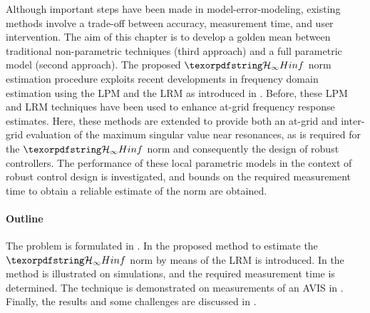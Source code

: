 Although important steps have been made in model-error-modeling, existing methods involve a trade-off between accuracy, measurement time, and user intervention.
The aim of this chapter is to develop a golden mean between traditional non-parametric techniques (third approach) and a full parametric model (second approach).
The proposed $\Hinf{}$ norm estimation procedure exploits recent developments in frequency domain estimation using the \gls{LPM} \citep{Schoukens2009LPM} and the \gls{LRM} \citep{McKelvey2012LRM} as introduced in \citet{Geerardyn2014IFAC,Geerardyn2014ISMA}.
Before, these \gls{LPM} and \gls{LRM} techniques have been used to enhance at-grid frequency response estimates.
Here, these methods are extended to provide both an at-grid and inter-grid evaluation of the maximum singular value near resonances, as is required for the $\Hinf{}$ norm and consequently the design of robust controllers.
The performance of these local parametric models in the context of robust control design is investigated, and bounds on the required measurement time to obtain a reliable estimate of the \Hinf{} norm are obtained.

\paragraph*{Outline}
\label{par:lrmhinf:toc}
The problem is formulated in .
In  the proposed method to estimate the $\Hinf{}$ norm by means of the \gls{LRM} is introduced.
In  the method is illustrated on simulations, and the required measurement time is determined.
The technique is demonstrated on measurements of an \gls{AVIS} in .
Finally, the results and some challenges are discussed in .


